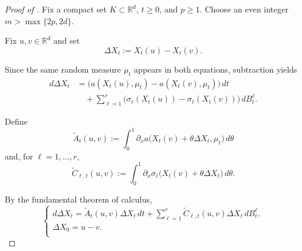 \documentclass{tsp-short}
\theoremstyle{remark}
\theoremstyle{definition}
\newcommand{\R}{\mathbb{R}} %
\newcommand{\E}{\mathbb E} %
\begin{document}
\begin{proof}[Proof of ]

	Fix a compact set \(K\subset\R^d\), \(t\ge0\), and \(p\ge1\). Choose an even integer \(m>\max\{2p,2d\}\).

	Fix \(u,v\in\R^d\) and set
	\begin{equation*}
		\Delta X_t:=X_t(u)-X_t(v).
	\end{equation*}

	Since the same random measure \(\mu_t\) appears in both equations, subtraction yields
	\begin{align*}
		d\Delta X_t & = \bigl( a(X_t(u),\mu_t)-a(X_t(v),\mu_t) \bigr)\,dt                                        \\
		            & \quad + \sum_{\ell=1}^{r} \bigl(\sigma_\ell(X_t(u))-\sigma_\ell(X_t(v)) \bigr)\,dB_t^\ell.
	\end{align*}

	Define
	\begin{equation*}
		\widetilde A_t(u,v) := \int_0^1 \partial_x a\bigl( X_t(v)+\theta\Delta X_t,\mu_t \bigr)\,d\theta
	\end{equation*}
	and, for \(\ell=1,\dots,r\),
	\begin{equation*}
		\widetilde C_{\ell,t}(u,v) := \int_0^1 \partial_x\sigma_\ell\bigl( X_t(v)+\theta\Delta X_t \bigr)\,d\theta.
	\end{equation*}

	By the fundamental theorem of calculus,
	\begin{equation*}
		\begin{cases}
			d\Delta X_t = \widetilde A_t(u,v)\Delta X_t\,dt + \sum_{\ell=1}^{r} \widetilde C_{\ell,t}(u,v)\Delta X_t\,dB_t^\ell, \\[2mm]
			\Delta X_0=u-v.                                                                                                      \\[2mm]
		\end{cases}
	\end{equation*}


\end{proof}
\end{document}
